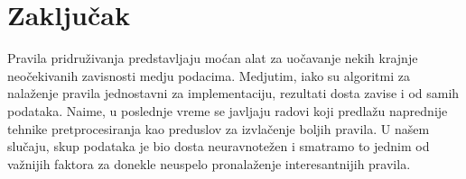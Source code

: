 \documentclass[a4paper,10pt]{article}
\begin{document}
\clearpage

\section{Zaključak}

Pravila pridruživanja predstavljaju moćan alat za uočavanje nekih krajnje 
neočekivanih zavisnosti medju podacima. Medjutim, iako su algoritmi za 
nalaženje pravila jednostavni za implementaciju, rezultati dosta zavise i od samih 
podataka. Naime, u poslednje vreme se javljaju radovi koji predlažu naprednije 
tehnike pretprocesiranja kao preduslov za izvlačenje boljih pravila.
U našem slučaju, skup podataka je bio dosta neuravnotežen i smatramo to jednim od 
važnijih faktora za donekle neuspelo pronalaženje interesantnijih pravila.
\end{document}
